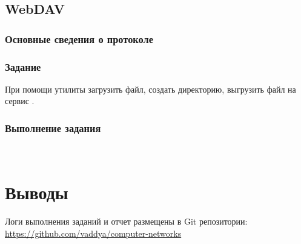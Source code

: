 

\subsection{WebDAV}

\subsubsection{Основные сведения о протоколе}

\subsubsection{Задание}

При помощи утилиты  загрузить файл, создать директорию, выгрузить файл на сервис .

\subsubsection{Выполнение задания}\ 



\section{Выводы}

Логи выполнения заданий и отчет размещены в Git репозитории:\\ 
\url{https://github.com/vaddya/computer-networks}


